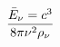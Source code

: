 \documentclass[preview]{standalone}
\begin{document}
\begin{align*}
\bar{E}_{\nu}={ c ^{3} } \over {8 \pi \nu^{2}} \rho_{\nu}
\end{align*}
\end{document}
